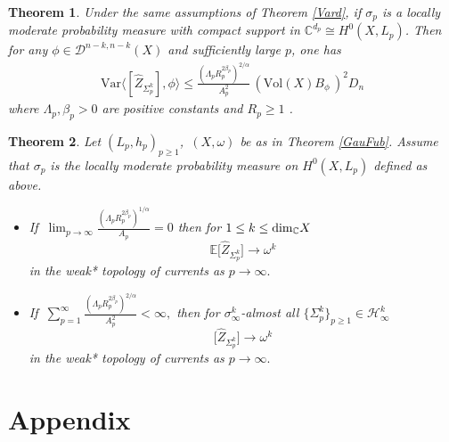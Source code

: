 \documentclass[11pt,leqno,oneside]{amsart}
\newtheorem{thm}{Theorem}[section]
\numberwithin{equation}{section}
\begin{document}
\begin{thm} Under the same assumptions of Theorem \ref{Vard}, if $\sigma_{p}$ is a locally moderate probability measure with compact support in $\mathbb{C}^{d_{p}}\cong H^{0}(X,L_{p})$. Then for any  $\phi\in \mathcal{D}^{n-k, n-k}(X)$ and sufficiently large $p$, one has \begin{align*}
		\mathrm{Var}\langle [\widehat{Z}_{\Sigma_{p}^{k}}], \phi \rangle  \leq \frac{(\Lambda_{p} R_{p}^{2\beta_{p}})^{2/\alpha}}{A_{p}^{2}}\,(\mathrm{Vol}(X)B_{\phi}\, )^{2} D_n
	\end{align*}where $\Lambda_{p}, \beta_{p}>0$ are positive constants and $R_{p}\geq 1$ .   \end{thm}


\begin{thm}Let $(L_{p}, h_{p})_{p\geq 1}$,\, $(X, \omega)$ be as in Theorem \ref{GauFub}. Assume that $\sigma_{p}$ is the locally moderate probability measure on $H^{0}(X, L_{p})$ defined as above.
	
	\begin{itemize}
		\item[(i)] If $\ \lim_{p \rightarrow \infty}\frac{(\Lambda_{p} R_{p}^{2\beta_{p}})^{1/\alpha}}{A_{p}}=0$ then for $1\leq k \leq \textup{dim}_{\mathbb{C}} X$
		\begin{equation*}
			\mathbb{E}\big[\widehat{Z}_{\Sigma_{p}^{k}}\big]\longrightarrow \omega^k
		\end{equation*}
		in the weak* topology of currents as $p\rightarrow \infty.$
		\item[(ii)] If $\ \sum_{p=1}^{\infty}\frac{(\Lambda_{p} R_{p}^{2\beta_{p}})^{2/\alpha}}{A_{p}^{2}}< \infty,$  then for $\sigma^{k}_{\infty}$-almost all $\{\Sigma_{p}^{k}\}_{p\geq 1}\in \mathcal{H}_{\infty}^{k}$
		\begin{equation*}
			\big[\widehat{Z}_{\Sigma_{p}^{k}}\big]\longrightarrow \omega^k
		\end{equation*}
		in the weak* topology of currents as $p \rightarrow \infty.$
	\end{itemize}
\end{thm}





\section{Appendix}
\end{document}

